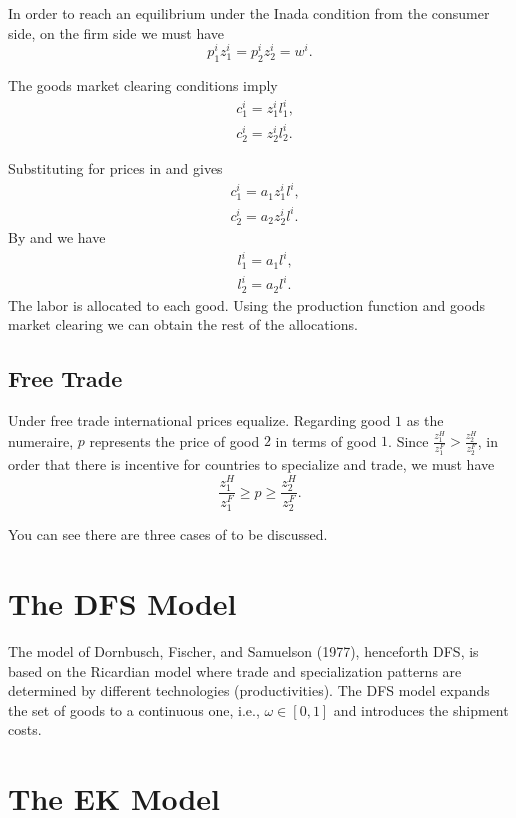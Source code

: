\documentclass[fontset=windows]{article}
\numberwithin{equation}{section}
\numberwithin{figure}{section}
\theoremstyle{plain}
\numberwithin{theorem}{section}
\numberwithin{lemma}{section}
\numberwithin{corollary}{section}
\numberwithin{definition}{section}
\numberwithin{proposition}{section}
\numberwithin{example}{section}
\numberwithin{assumption}{section}
\begin{document}
In order to reach an equilibrium under the Inada condition from the consumer side, on the firm side we must have 
\begin{equation}
    p^i_1 z^i_1 = p^i_2 z^i_2 = w^i. \label{eq.rwage}
\end{equation}

The goods market clearing conditions imply 
\begin{align}
    & c^i_1 = z^i_1 l^i_1, \label{eq.req1} \\ 
    & c^i_2 = z^i_2 l^i_2. \label{eq.req2}
\end{align} 

Substituting  for prices in  and  gives 
\begin{align*}
    & c^i_1 = a_1 z^i_1 l^i, \\ 
    & c^i_2 = a_2 z^i_2 l^i.
\end{align*}
By  and  we have 
\begin{align}
    & l^i_1 = a_1 l^i, \\ 
    & l^i_2 = a_2 l^i.  
\end{align}
The labor is allocated to each good. Using the production function and goods market clearing we can obtain the rest of the allocations. 

\subsection{Free Trade}
\noindent Under free trade international prices equalize. Regarding good $1$ as the numeraire, $p$ represents the price of good $2$ in terms of good $1$. 
Since $\frac{z^H_1}{z^F_1} > \frac{z^H_2}{z^F_2}$, in order that there is incentive for countries to specialize and trade, we must have 
\begin{equation}
    \frac{z^H_1}{z^F_1} \geq p \geq \frac{z^H_2}{z^F_2}. \label{eq.rtrade} 
\end{equation}

You can see there are three cases of  to be discussed. 


\section{The DFS Model} 

\noindent The model of Dornbusch, Fischer, and Samuelson (1977), henceforth DFS, is based on the Ricardian model where trade and 
specialization patterns are determined by different technologies (productivities). 
The DFS model expands the set of goods to a continuous one, i.e., $\omega \in [0,1]$ and introduces the shipment costs. 




\section{The EK Model}
\end{document}
